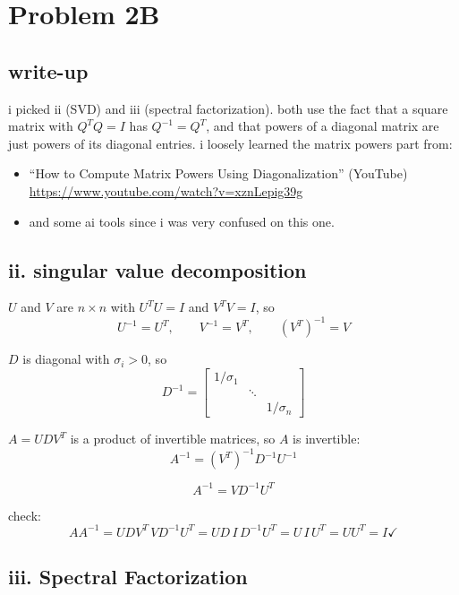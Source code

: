 \documentclass{article}
\begin{document}
\section*{Problem 2B}

\subsection*{write-up}

i picked ii (SVD) and iii (spectral factorization).
both use the fact that a square matrix with $Q^TQ = I$ has $Q^{-1} = Q^T$,
and that powers of a diagonal matrix are just powers of its diagonal entries.
i loosely learned the matrix powers part from:

\begin{itemize}
  \item ``How to Compute Matrix Powers Using Diagonalization'' (YouTube) \\
        \url{https://www.youtube.com/watch?v=xznLepig39g}
  \item and some ai tools since i was very confused on this one. \\
\end{itemize}

\subsection*{ii. singular value decomposition}

$U$ and $V$ are $n \times n$ with $U^TU = I$ and $V^TV = I$, so
\[
U^{-1} = U^T, \qquad V^{-1} = V^T, \qquad (V^T)^{-1} = V
\]

$D$ is diagonal with $\sigma_i > 0$, so
\[
D^{-1} =
\begin{bmatrix}
1/\sigma_1 & & \\
& \ddots & \\
& & 1/\sigma_n
\end{bmatrix}
\]

$A = UDV^T$ is a product of invertible matrices, so $A$ is invertible:
\[
A^{-1} = (V^T)^{-1} D^{-1} U^{-1}
\]

\[
\boxed{A^{-1} = V D^{-1} U^T}
\]

check:
\[
A A^{-1} = UDV^T \, V D^{-1} U^T = UD \, I \, D^{-1} U^T = U \, I \, U^T = UU^T = I \checkmark
\]

\subsection*{iii. Spectral Factorization}
\end{document}

